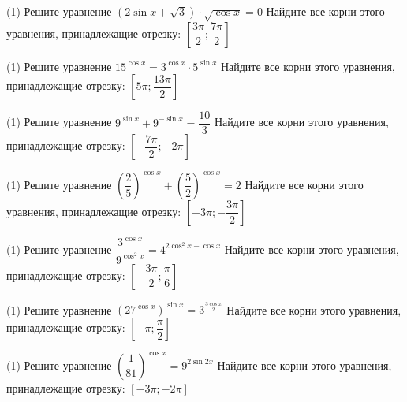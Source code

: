 %
%

\begin{class}[number=1]
	\begin{listofex}
	\item %
	\begin{tasks}(1)
		\task Решите уравнение \( (2\sin x+\sqrt{3}) \cdot \sqrt{\cos x}=0 \)
		\task Найдите все корни этого уравнения, принадлежащие отрезку: \( \left[ \dfrac{3\pi}{2}; \dfrac{7\pi}{2} \right] \)
	\end{tasks}
	\item %
	\begin{tasks}(1)
		\task Решите уравнение \( 15^{\cos x}=3^{\cos x} \cdot 5^{\sin x} \)
		\task Найдите все корни этого уравнения, принадлежащие отрезку: \( \left[ 5\pi; \dfrac{13\pi}{2} \right]  \)
	\end{tasks}
	\item %
	\begin{tasks}(1)
		\task Решите уравнение \( 9^{\sin{x}}+9^{-\sin x}=\dfrac{10}{3} \)
		\task Найдите все корни этого уравнения, принадлежащие отрезку: \( \left[ -\dfrac{7\pi}{2}; -2\pi \right]  \)
	\end{tasks}
	\item %
	\begin{tasks}(1)
		\task Решите уравнение \( \left( \dfrac{2}{5} \right)^{\cos x}+ \left( \dfrac{5}{2} \right)^{\cos x}=2 \)
		\task Найдите все корни этого уравнения, принадлежащие отрезку: \( \left[ -3\pi;-\dfrac{3\pi}{2} \right]  \)
	\end{tasks}
	\item %
	\begin{tasks}(1)
		\task Решите уравнение \( \dfrac{3^{\cos x}}{9^{\cos^2x}}=4^{2\cos^2x-\cos x} \)
		\task Найдите все корни этого уравнения, принадлежащие отрезку: \( \left[ -\dfrac{3\pi}{2}; \dfrac{\pi}{6} \right]  \)
	\end{tasks}
	\item %
	\begin{tasks}(1)
		\task Решите уравнение \( (27^{\cos x})^{\sin x}=3^{\frac{3\cos x}{2}} \)
		\task Найдите все корни этого уравнения, принадлежащие отрезку: \( \left[ -\pi; \dfrac{\pi}{2} \right]  \)
	\end{tasks}
	\item %
	\begin{tasks}(1)
		\task Решите уравнение \( \left( \dfrac{1}{81} \right)^{\cos x}=9^{2\sin{2x}} \)
		\task Найдите все корни этого уравнения, принадлежащие отрезку: \( [-3\pi; -2\pi] \)
	\end{tasks}
	\end{listofex}
\end{class}

